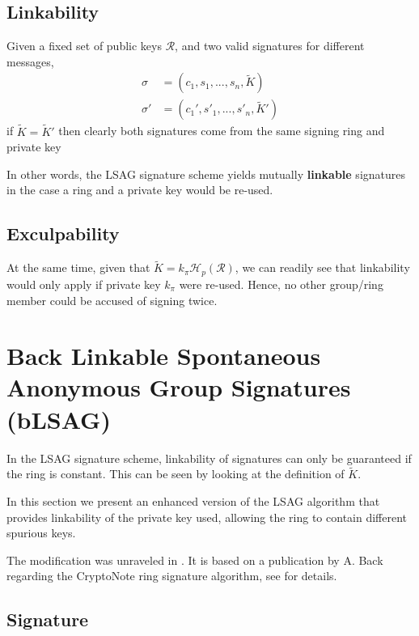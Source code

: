 \subsection*{Linkability}

Given a fixed set of public keys \(\mathcal{R}\), and two valid signatures for different messages, 
\begin{align*}
\sigma   &= (c_1, s_1, ..., s_n, \tilde{K})\\
\sigma'  &= (c_1', s'_1, ..., s'_n, \tilde{K}')
\end{align*}
if \(\tilde{K} =  \tilde{K}'\) then clearly both signatures come from the same signing ring and private key

In other words, the LSAG signature scheme yields mutually {\bf linkable} signatures in the case a ring and a private key would be re-used.


\subsection*{Exculpability}

At the same time, given that \(\tilde{K} = k_\pi \mathcal{H}_p(\mathcal{R})\), we can readily see that linkability 
would only apply if private key \(k_\pi\) were re-used. 
Hence, no other group/ring member could be accused of signing twice. 




\section{Back Linkable Spontaneous Anonymous Group Signatures (bLSAG)}

In the LSAG signature scheme, linkability of signatures can only be guaranteed if the ring is constant.
This can be seen by looking at the definition of \(\tilde{K}\).

In this section we present an enhanced version of the LSAG algorithm that provides linkability of the private key used, allowing the
ring to contain different spurious keys.

The modification was unraveled in \cite{cryptoeprint:2015:1098}. It is based on a publication by A. Back regarding the CryptoNote ring signature algorithm, see \cite{AdamBack-ring-efficiency} for details.


\subsection*{Signature}


